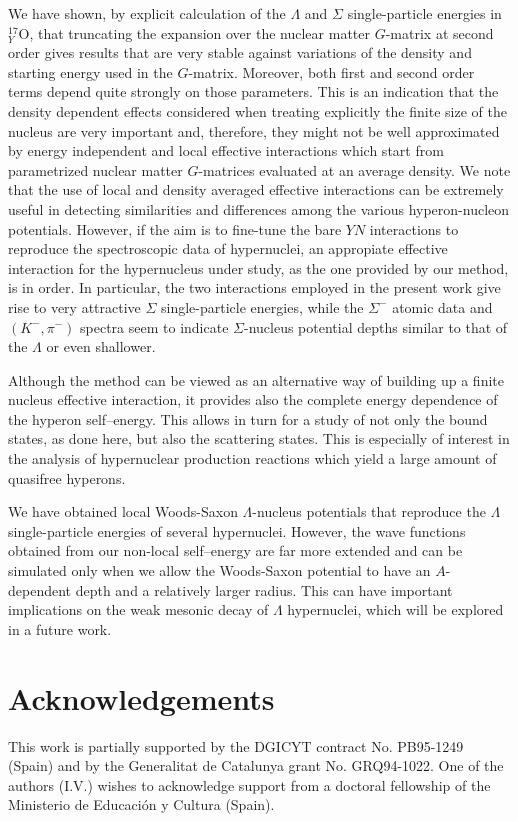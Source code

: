 We have shown, by explicit calculation of the $\Lambda$ and $\Sigma$
single-particle energies in $^{17}_Y$O, that truncating the expansion
over the nuclear matter $G$-matrix at second order gives results that 
are very stable against variations of the density and starting energy
used in the $G$-matrix. Moreover, both first and second order terms depend
quite strongly on those parameters. This is an indication that
the density dependent effects considered when treating explicitly the
finite
size of the nucleus are very important and, therefore,  
they might not be well approximated by energy independent and local effective 
interactions
which start from parametrized  
nuclear matter $G$-matrices evaluated at an average density. 
We note that the use of local and density averaged effective
interactions can be extremely useful in detecting similarities and differences
among the various hyperon-nucleon potentials. However, if the aim is 
to fine-tune the bare $YN$ interactions to reproduce the spectroscopic
data of
hypernuclei, an appropiate effective interaction for the 
hypernucleus under study, as the one provided by our method, is in order.
In particular, the two interactions employed in the present work give rise
to very attractive $\Sigma$ single-particle energies, while the
$\Sigma^-$ atomic data and
$(K^-,\pi^-)$ spectra seem to indicate $\Sigma$-nucleus potential depths
similar to that of the $\Lambda$ or even shallower. 
 
Although the method can be viewed as an alternative
way of building up a finite nucleus effective interaction, it
provides also the complete energy dependence of
the
hyperon self--energy. This allows in turn for a study of not only the
bound
states, as done here, but also the scattering states. This is especially  
of interest in the analysis of hypernuclear production
reactions which yield a large amount of quasifree hyperons.

We have obtained local Woods-Saxon $\Lambda$-nucleus potentials that
reproduce the $\Lambda$ single-particle energies of several hypernuclei.
However, the wave functions obtained from our non-local self--energy
are far more extended and can be simulated only when we
allow the Woods-Saxon potential  to have an $A$-dependent depth and a relatively 
larger radius. 
This can have important implications on the
weak mesonic decay of $\Lambda$ hypernuclei, which will be explored in
a future work.  

\section{Acknowledgements}
This work is partially supported by the DGICYT contract No. PB95-1249
(Spain) and by the Generalitat de Catalunya grant No. GRQ94-1022. One of
the authors (I.V.) wishes to acknowledge support from a doctoral fellowship 
of the Ministerio de Educaci\'on y Cultura (Spain).


